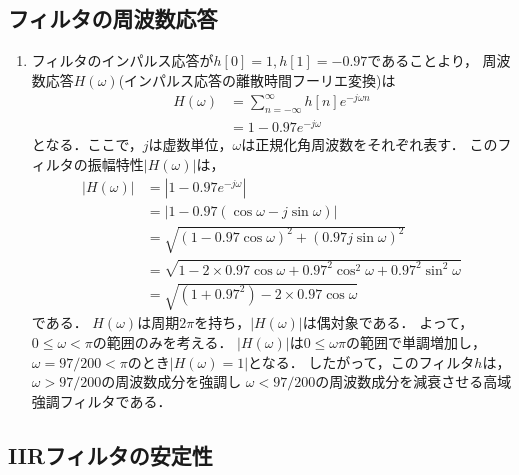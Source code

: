 \subsection{フィルタの周波数応答}
  \begin{enumerate}[label=(\roman*)]
    \item フィルタのインパルス応答が$h[0] = 1, h[1] = -0.97$であることより，
      周波数応答$H(\omega)$(インパルス応答の離散時間フーリエ変換)は
      \begin{align}
        H(\omega) &= \sum_{n = -\infty}^{\infty} h[n] e^{-j\omega n} \\
                  &= 1 - 0.97 e^{-j \omega}
      \end{align}
      となる．ここで，$j$は虚数単位，$\omega$は正規化角周波数をそれぞれ表す．
      このフィルタの振幅特性$|H(\omega)|$は，
      \begin{align}
        |H(\omega)| &= | 1 - 0.97 e^{-j \omega}| \\
                    &= | 1 - 0.97 (\cos \omega - j \sin \omega)| \\
                    &= \sqrt{(1 - 0.97 \cos \omega)^2 + (0.97 j \sin \omega)^2} \\
                    &= \sqrt{1 - 2 \times 0.97 \cos \omega + 0.97^2 \cos^2 \omega
                     + 0.97^2 \sin^2 \omega} \\
                    &= \sqrt{(1 + 0.97^2) - 2 \times 0.97 \cos \omega}
      \end{align}
      である．
      $H(\omega)$は周期$2\pi$を持ち，$|H(\omega)|$は偶対象である．
      よって，$0 \le \omega < \pi$の範囲のみを考える．
      $|H(\omega)|$は$0 \le \omega \pi$の範囲で単調増加し，
      $\omega = 97 / 200 < \pi$のとき$|H(\omega) = 1|$となる．
      したがって，このフィルタ$h$は，
      $\omega > 97 / 200$の周波数成分を強調し
      $\omega < 97 / 200$の周波数成分を減衰させる高域強調フィルタである．
  \end{enumerate}

\subsection{IIRフィルタの安定性}
